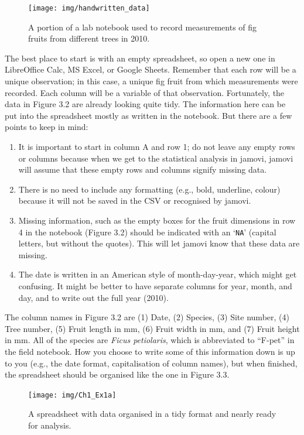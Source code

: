 \documentclass[
]{scrbook}
\providecommand{\tightlist}{%
  \setlength{\itemsep}{0pt}\setlength{\parskip}{0pt}}
\begin{document}
\begin{figure}
\texttt{[image: img/handwritten\_data]} \caption{A portion of a lab notebook used to record measurements of fig fruits from different trees in 2010.}\label{fig:unnamed-chunk-11}
\end{figure}

The best place to start is with an empty spreadsheet, so open a new one in LibreOffice Calc, MS Excel, or Google Sheets.
Remember that each row will be a unique observation; in this case, a unique fig fruit from which measurements were recorded.
Each column will be a variable of that observation.
Fortunately, the data in Figure 3.2 are already looking quite tidy.
The information here can be put into the spreadsheet mostly as written in the notebook.
But there are a few points to keep in mind:

\begin{enumerate}
\def\labelenumi{\arabic{enumi}.}
\tightlist
\item
  It is important to start in column A and row 1; do not leave any empty rows or columns because when we get to the statistical analysis in jamovi, jamovi will assume that these empty rows and columns signify missing data.
\item
  There is no need to include any formatting (e.g., bold, underline, colour) because it will not be saved in the CSV or recognised by jamovi.
\item
  Missing information, such as the empty boxes for the fruit dimensions in row 4 in the notebook (Figure 3.2) should be indicated with an `\texttt{NA}' (capital letters, but without the quotes). This will let jamovi know that these data are missing.
\item
  The date is written in an American style of month-day-year, which might get confusing. It might be better to have separate columns for year, month, and day, and to write out the full year (2010).
\end{enumerate}

The column names in Figure 3.2 are (1) Date, (2) Species, (3) Site number, (4) Tree number, (5) Fruit length in mm, (6) Fruit width in mm, and (7) Fruit height in mm.
All of the species are \emph{Ficus petiolaris}, which is abbreviated to ``F-pet'' in the field notebook.
How you choose to write some of this information down is up to you (e.g., the date format, capitalisation of column names), but when finished, the spreadsheet should be organised like the one in Figure 3.3.

\begin{figure}
\texttt{[image: img/Ch1\_Ex1a]} \caption{A spreadsheet with data organised in a tidy format and nearly ready for analysis.}\label{fig:unnamed-chunk-12}
\end{figure}
\end{document}
